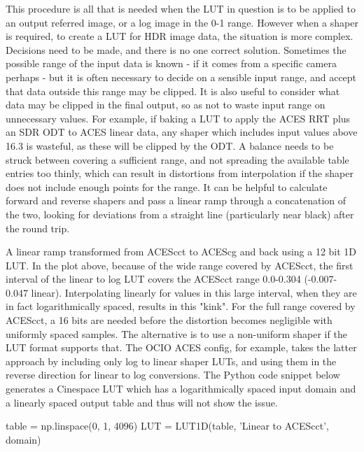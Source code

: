 This procedure is all that is needed when the LUT in question is to be applied to an output referred image, or a log image in the 0-1 range. However when a shaper is required, to create a LUT for HDR image data, the situation is more complex. Decisions need to be made, and there is no one correct solution. Sometimes the possible range of the input data is known - if it comes from a specific camera perhaps - but it is often necessary to decide on a sensible input range, and accept that data outside this range may be clipped. It is also useful to consider what data may be clipped in the final output, so as not to waste input range on unnecessary values. For example, if baking a LUT to apply the ACES RRT plus an SDR ODT to ACES linear data, any shaper which includes input values above 16.3 is wasteful, as these will be clipped by the ODT. A balance needs to be struck between covering a sufficient range, and not spreading the available table entries too thinly, which can result in distortions from interpolation if the shaper does not include enough points for the range. It can be helpful to calculate forward and reverse shapers and pass a linear ramp through a concatenation of the two, looking for deviations from a straight line (particularly near black) after the round trip.

A linear ramp transformed from ACEScct to ACEScg and back using a 12 bit 1D LUT.
In the plot above, because of the wide range covered by ACEScct, the first interval of the linear to log LUT covers the ACEScct range 0.0-0.304 (-0.007-0.047 linear). Interpolating linearly for values in this large interval, when they are in fact logarithmically spaced, results in this "kink". For the full range covered by ACEScct, a 16 bits are needed before the distortion becomes negligible with uniformly spaced samples. The alternative is to use a non-uniform shaper if the LUT format supports that. The OCIO ACES config, for example, takes the latter approach by including only log to linear shaper LUTs, and using them in the reverse direction for linear to log conversions. The Python code snippet below generates a Cinespace LUT which has a logarithmically spaced input domain and a linearly spaced output table and thus will not show the issue.


table = np.linspace(0, 1, 4096)
LUT = LUT1D(table, 'Linear to ACEScct', domain)

